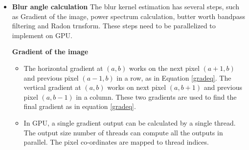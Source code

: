 \begin{itemize}	
	\item \textbf{Blur angle calculation} \hfill \break
	The blur kernel estimation has several steps, such as Gradient of the image, power spectrum calculation, butter worth bandpass filtering and Radon trnsform. These steps need to be parallelized to implement on GPU. 
	\par \textbf{Gradient of the image} \hfill \break
	\begin{itemize}

	\item The horizontal gradient at $(a,b)$ works on the next pixel $(a+1,b)$ and previous pixel $(a-1,b)$ in a row, as in Equation \ref{gradeq}. The vertical gradient at $(a,b)$ works on next pixel $(a,b+1)$ and previous pixel $(a,b-1)$ in a column. These two gradients are used to find the final gradient as in equation \ref{gradeq}.
	\item In GPU, a single gradient output can be calculated by a single thread. The output size number of threads can compute all the outputs in parallel. The pixel co-ordinates are mapped to thread indices.


\end{itemize}
\end{itemize}
